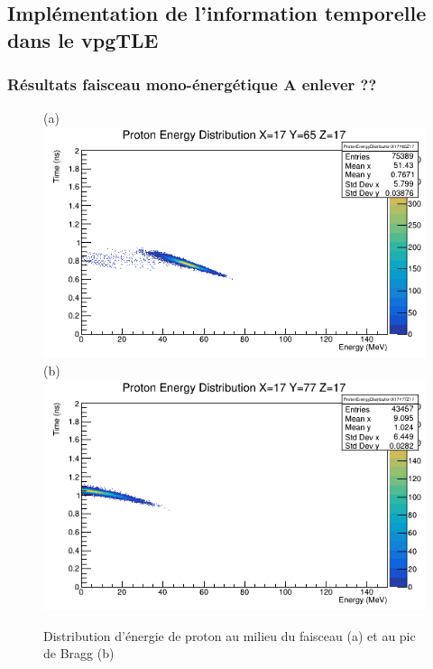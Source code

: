 \documentclass[11pt,a4paper,oldfontcommands]{memoir}
\begin{document}
\subsection{Implémentation de l'information temporelle dans le vpgTLE}





\newpage

\appendix

\subsubsection{Résultats faisceau mono-énergétique A enlever ??}
\begin{figure}[h!]
\centering
\subfloat(a){\includegraphics[scale=0.37]{CT/130/FaisceauProt.png}}
\subfloat(b){\includegraphics[scale=0.37]{CT/130/BraggProt.png}}
\caption{Distribution d'énergie de proton au milieu du faisceau (a) et au pic de Bragg (b)}
\label{130 prot}
\end{figure}
\end{document}
